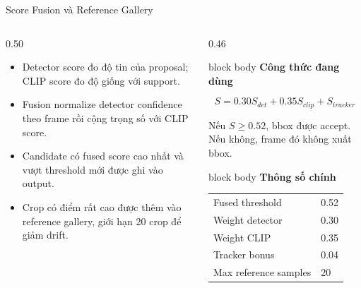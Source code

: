 \documentclass[aspectratio=169]{beamer}
\newcommand{\tightitem}{\setlength\itemsep{0.42em}}
\newenvironment{bluebox}[1]{
  \begin{beamercolorbox}[rounded=true,shadow=false,wd=\linewidth,sep=0.28cm]{block body}
  {\bfseries\color{DeepBlue}#1}\par\vspace{0.12cm}
}{
  \end{beamercolorbox}
}
\begin{document}
\begin{frame}{Score Fusion và Reference Gallery}
  \begin{columns}[T,onlytextwidth]
    \begin{column}{0.50\textwidth}
      \begin{itemize}
        \tightitem
        \item Detector score đo độ tin của proposal; CLIP score đo độ giống với support.
        \item Fusion normalize detector confidence theo frame rồi cộng trọng số với CLIP score.
        \item Candidate có fused score cao nhất và vượt threshold mới được ghi vào output.
        \item Crop có điểm rất cao được thêm vào reference gallery, giới hạn 20 crop để giảm drift.
      \end{itemize}
    \end{column}
    \begin{column}{0.46\textwidth}
      \begin{bluebox}{Công thức đang dùng}
        \scriptsize
        \[
          S = 0.30S_{det} + 0.35S_{clip} + S_{tracker}
        \]\vspace{-0.2cm}
        \par
        Nếu \(S \geq 0.52\), bbox được accept. Nếu không, frame đó không xuất bbox.
      \end{bluebox}
      \begin{bluebox}{Thông số chính}
        \scriptsize
        \begin{tabular}{ll}
          Fused threshold & 0.52 \\
          Weight detector & 0.30 \\
          Weight CLIP & 0.35 \\
          Tracker bonus & 0.04 \\
          Max reference samples & 20 \\
        \end{tabular}
      \end{bluebox}
    \end{column}
  \end{columns}
\end{frame}
\end{document}
